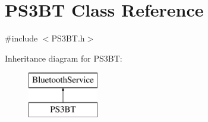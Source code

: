 \hypertarget{class_p_s3_b_t}{\section{\-P\-S3\-B\-T \-Class \-Reference}
\label{class_p_s3_b_t}
}


{\ttfamily \#include $<$\-P\-S3\-B\-T.\-h$>$}

\-Inheritance diagram for \-P\-S3\-B\-T\-:\begin{figure}[H]
\begin{center}
\leavevmode
\includegraphics[height=2.000000cm]{class_p_s3_b_t}
\end{center}
\end{figure}
